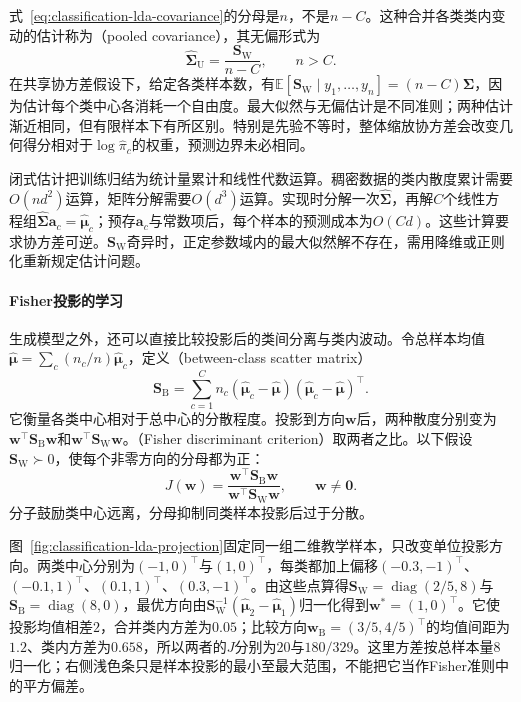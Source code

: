 式~\eqref{eq:classification-lda-covariance}的分母是$n$，不是$n-C$。这种合并各类类内变动的估计称为（pooled covariance），其无偏形式为
\[
  \hat{\bm{\Sigma}}_{\mathrm{U}}
    =\frac{\bm{S}_{\mathrm{W}}}{n-C},\qquad n>C .
\]
在共享协方差假设下，给定各类样本数，有$\mathbb{E}[\bm{S}_{\mathrm{W}}\mid y_1,\ldots,y_n]=(n-C)\bm{\Sigma}$，因为估计每个类中心各消耗一个自由度。最大似然与无偏估计是不同准则；两种估计渐近相同，但有限样本下有所区别。特别是先验不等时，整体缩放协方差会改变几何得分相对于$\log\hat\pi_c$的权重，预测边界未必相同。

闭式估计把训练归结为统计量累计和线性代数运算。稠密数据的类内散度累计需要$O(nd^2)$运算，矩阵分解需要$O(d^3)$运算。实现时分解一次$\hat{\bm{\Sigma}}$，再解$C$个线性方程组$\hat{\bm{\Sigma}}\bm{a}_c=\hat{\bm{\mu}}_c$；预存$\bm{a}_c$与常数项后，每个样本的预测成本为$O(Cd)$。这些计算要求协方差可逆。$\bm{S}_{\mathrm{W}}$奇异时，正定参数域内的最大似然解不存在，需用降维或正则化重新规定估计问题。

\paragraph{Fisher投影的学习}
生成模型之外，还可以直接比较投影后的类间分离与类内波动。令总样本均值$\hat{\bm{\mu}}=\sum_c(n_c/n)\hat{\bm{\mu}}_c$，定义（between-class scatter matrix）
\[
  \bm{S}_{\mathrm{B}}
    =\sum_{c=1}^{C}n_c
      (\hat{\bm{\mu}}_c-\hat{\bm{\mu}})
      (\hat{\bm{\mu}}_c-\hat{\bm{\mu}})^{\top}.
\]
它衡量各类中心相对于总中心的分散程度。投影到方向$\bm{w}$后，两种散度分别变为$\bm{w}^{\top}\bm{S}_{\mathrm{B}}\bm{w}$和$\bm{w}^{\top}\bm{S}_{\mathrm{W}}\bm{w}$。（Fisher discriminant criterion）取两者之比。以下假设$\bm{S}_{\mathrm{W}}\succ0$，使每个非零方向的分母都为正：
\begin{equation}
  \label{eq:classification-fisher-criterion}
  J(\bm{w})
    =\frac{\bm{w}^{\top}\bm{S}_{\mathrm{B}}\bm{w}}
      {\bm{w}^{\top}\bm{S}_{\mathrm{W}}\bm{w}},
    \qquad \bm{w}\ne\bm{0}.
\end{equation}
分子鼓励类中心远离，分母抑制同类样本投影后过于分散。

图~\ref{fig:classification-lda-projection}固定同一组二维教学样本，只改变单位投影方向。两类中心分别为$(-1,0)^{\top}$与$(1,0)^{\top}$，每类都加上偏移$(-0.3,-1)^{\top}$、$(-0.1,1)^{\top}$、$(0.1,1)^{\top}$、$(0.3,-1)^{\top}$。由这些点算得$\bm{S}_{\mathrm{W}}=\operatorname{diag}(2/5,8)$与$\bm{S}_{\mathrm{B}}=\operatorname{diag}(8,0)$，最优方向由$\bm{S}_{\mathrm{W}}^{-1}(\hat{\bm\mu}_2-\hat{\bm\mu}_1)$归一化得到$\bm w^\ast=(1,0)^{\top}$。它使投影均值相差$2$，合并类内方差为$0.05$；比较方向$\bm w_{\mathrm B}=(3/5,4/5)^{\top}$的均值间距为$1.2$、类内方差为$0.658$，所以两者的$J$分别为$20$与$180/329$。这里方差按总样本量$8$归一化；右侧浅色条只是样本投影的最小至最大范围，不能把它当作Fisher准则中的平方偏差。


